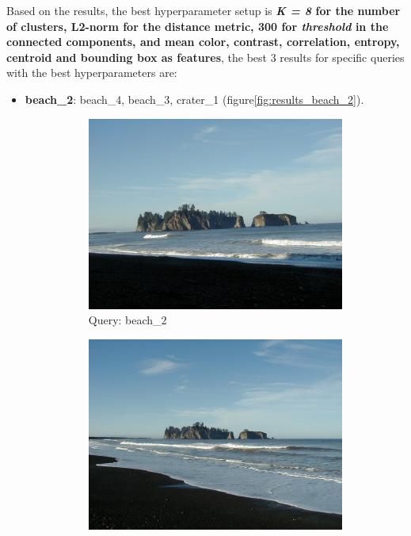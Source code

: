 Based on the results, the best hyperparameter setup is \textbf{\textit{K = 8} for the number of clusters, L2-norm for the distance metric, 300 for \textit{threshold} in the connected components, and mean color, contrast, correlation, entropy, centroid and bounding box as features}, the best 3 results for  specific queries with the best hyperparameters are:


\begin{itemize}
\item \textbf{beach\_2}: beach\_4, beach\_3, crater\_1 (figure\ref{fig:results_beach_2}).

\begin{figure}[H]
	\centering
	\begin{subfigure}{0.25\textwidth}
	  \centering
	  \includegraphics[width=0.9\linewidth]{../input/beach_2.jpg}
	  \caption{Query: beach\_2}
	\end{subfigure}%
	\begin{subfigure}{0.25\textwidth}
	  \centering
	  \includegraphics[width=0.9\linewidth]{../input/beach_4.jpg}

\end{subfigure}
\end{figure}
\end{itemize}
